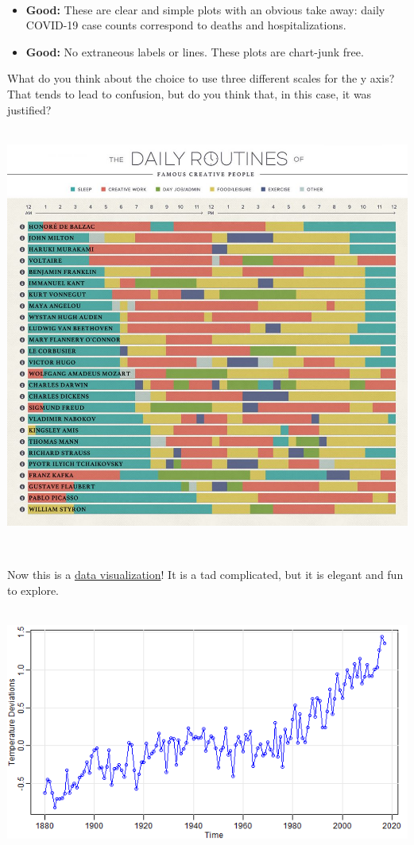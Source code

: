 \documentclass[
]{book}
\begin{document}
~

\begin{itemize}
\item
  \textbf{Good:} These are clear and simple plots with an obvious take away: daily COVID-19 case counts correspond to deaths and hospitalizations.
\item
  \textbf{Good:} No extraneous labels or lines. These plots are chart-junk free.
\end{itemize}

What do you think about the choice to use three different scales for the y axis? That tends to lead to confusion, but do you think that, in this case, it was justified?

~\\

\includegraphics{img/vis-routines.jpeg}

~

Now this is a \href{https://podio.com/site/creative-routines}{data visualization}! It is a tad complicated, but it is elegant and fun to explore.

~\\

\includegraphics{img/visi.png}
\end{document}
